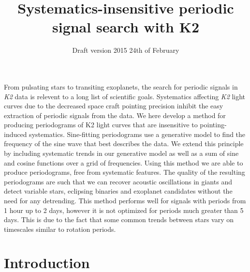 \documentclass[useAMS, usenatbib]{aastex}
\title{Systematics-insensitive periodic signal search with K2}
\begin{document}
\date{Draft version 2015 24th of February}
\maketitle

From pulsating stars to transiting exoplanets, the search for periodic signals
in {\it K2} data is relevent to a long list of scientific goals.
Systematics affecting {\it K2} light curves due to the decreased
space craft pointing precision inhibit the easy extraction of periodic signals
from the data.
We here develop a method for producing periodograms of K2 light curves that
are insensitive to pointing-induced systematics.
Sine-fitting periodograms use a generative model to find the frequency
of the sine wave that best describes the data.
We extend this principle by including systematic trends in our generative
model as well as a sum of sine and cosine functions over a grid of
frequencies.
Using this method we are able to produce periodograms, free from
systematic features.
The quality of the resulting periodograms are such that we can recover
acoustic oscillations in giants and detect variable stars, eclipsing binaries
and exoplanet candidates without the need for any detrending.
This method performs well for signals with periods from 1 hour up to 2 days,
however it is not optimized for periods much greater than 5 days.
This is due to the fact that some common trends between stars vary on
timescales similar to rotation periods.

\section{Introduction}
\label{Introduction}
\end{document}
